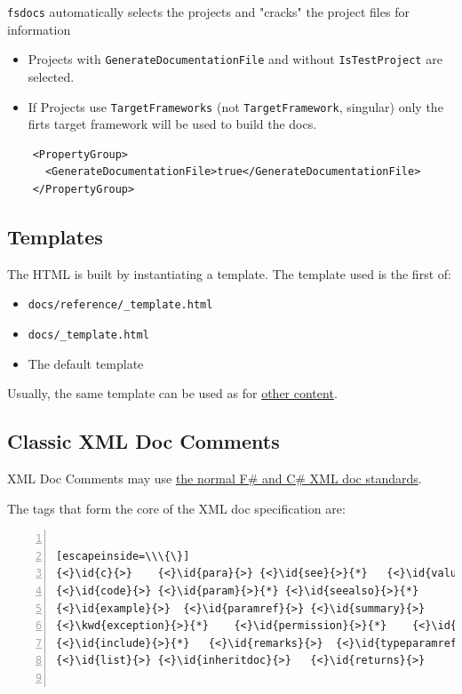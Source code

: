 \documentclass{article}
\newcommand{\id}[1]{\textcolor{black}{#1}}
\newcommand{\kwd}[1]{\textcolor{navy}{#1}}
\begin{document}
\texttt{fsdocs} automatically selects the projects and "cracks" the project files for information
\begin{itemize}
\item Projects with \texttt{GenerateDocumentationFile} and without \texttt{IsTestProject} are selected.

\item If Projects use \texttt{TargetFrameworks} (not \texttt{TargetFramework}, singular) only the firts target framework will be used to build the docs.

\end{itemize}

\begin{lstlisting}
    <PropertyGroup>
      <GenerateDocumentationFile>true</GenerateDocumentationFile>
    </PropertyGroup>

\end{lstlisting}
\subsection*{Templates}



The HTML is built by instantiating a template. The template used is the first of:
\begin{itemize}
\item 

\texttt{docs/reference/\_template.html}

\item 

\texttt{docs/\_template.html}

\item 

The default template

\end{itemize}



Usually, the same template can be used as for \href{content.html}{other content}.
\subsection*{Classic XML Doc Comments}



XML Doc Comments may use \href{https://learn.microsoft.com/en-us/dotnet/csharp/programming-guide/xmldoc/}{the normal F\# and C\# XML doc standards}.


The tags that form the core of the XML doc specification are:
\begin{lstlisting}[numbers=left]

[escapeinside=\\\{\}]
{<}\id{c}{>}	{<}\id{para}{>}	{<}\id{see}{>}{*}	{<}\id{value}{>}
{<}\id{code}{>}	{<}\id{param}{>}{*}	{<}\id{seealso}{>}{*}
{<}\id{example}{>}	{<}\id{paramref}{>}	{<}\id{summary}{>}
{<}\kwd{exception}{>}{*}	{<}\id{permission}{>}{*}	{<}\id{typeparam}{>}{*}
{<}\id{include}{>}{*}	{<}\id{remarks}{>}	{<}\id{typeparamref}{>}
{<}\id{list}{>}	{<}\id{inheritdoc}{>}	{<}\id{returns}{>}


\end{lstlisting}
\end{document}
